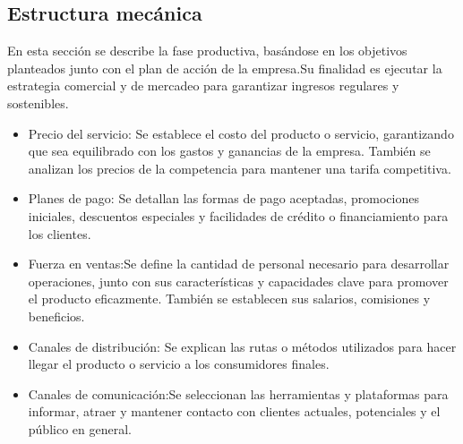\subsection{Estructura mecánica}

En esta sección se describe la fase productiva, basándose en los objetivos planteados junto con el plan de acción de la empresa.Su finalidad es ejecutar la estrategia comercial y de mercadeo para garantizar ingresos regulares y sostenibles.

\begin{itemize}
    \item Precio del servicio: Se establece el costo del producto o servicio, garantizando que sea equilibrado con los gastos y ganancias de la empresa. También se analizan los precios de la competencia para mantener una tarifa competitiva.
    
    \item Planes de pago: Se detallan las formas de pago aceptadas, promociones iniciales, descuentos especiales y facilidades de crédito o financiamiento para los clientes.

    \item Fuerza en ventas:Se define la cantidad de personal necesario para desarrollar operaciones, junto con sus características y capacidades clave para promover el producto eficazmente. También se establecen sus salarios, comisiones y beneficios.

    \item Canales de distribución: Se explican las rutas o métodos utilizados para hacer llegar el producto o servicio a los consumidores finales.
    
    \item Canales de comunicación:Se seleccionan las herramientas y plataformas para informar, atraer y mantener contacto con clientes actuales, potenciales y el público en general.
\end{itemize}
